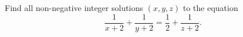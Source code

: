 Find all non-negative integer solutions $(x,y,z)$ to the equation
$$\frac{1}{x+2}+\frac{1}{y+2}=\frac{1}{2}+\frac{1}{z+2}.$$